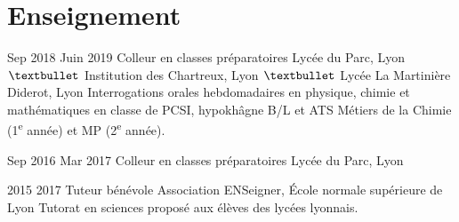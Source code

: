 \documentclass[letterpaper]{cvtemplate_fr} %
\begin{document}
\section{Enseignement}
\begin{cvbody}

\cvitem
	{Sep 2018}
	{Juin 2019}
	{Colleur en classes pr\'eparatoires}
	{Lyc\'ee du Parc, Lyon $\textbullet$ Institution des Chartreux, Lyon $\textbullet$ Lyc\'ee La Martinière Diderot, Lyon }
	{}{}{}
	{}
	{Interrogations orales hebdomadaires en physique, chimie et math\'ematiques en classe de PCSI, hypokh\^agne B/L et ATS M\'etiers de la Chimie (1\textsuperscript{e} ann\'ee) et MP (2\textsuperscript{e} ann\'ee).\\}

\cvitem
	{Sep 2016}
	{Mar 2017}
	{Colleur en classes pr\'eparatoires}
	{Lyc\'ee du Parc, Lyon }
	{}{}{}
	{}
	{}

\cvitem
	{2015}
	{2017}
	{Tuteur b\'en\'evole}
	{Association ENSeigner, \'Ecole normale sup\'erieure de Lyon }
	{}{}{}
	{}
	{Tutorat en sciences propos\'e aux \'el\`eves des lyc\'ees lyonnais.}

\end{cvbody}
\end{document}
